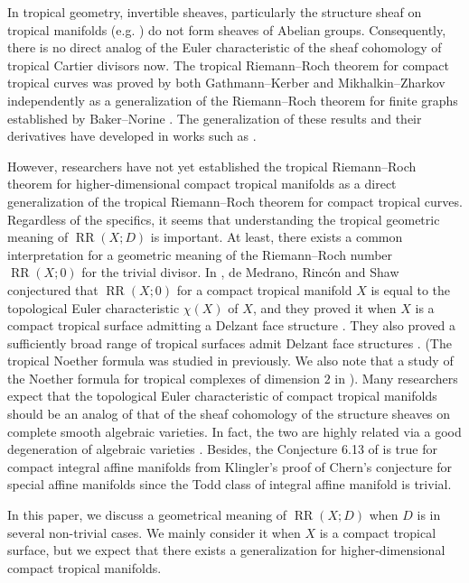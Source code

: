\documentclass[a4paper,dvipdfmx,reqno,12pt]{amsart}
\theoremstyle{definition}
\newcommand{\opn}[1]{\operatorname{#1}}
\numberwithin{equation}{section}
\begin{document}
In tropical geometry, invertible sheaves,
particularly the structure sheaf
on tropical manifolds
(e.g. \cite[]{MR3330789}) 
do not form sheaves of Abelian groups.
Consequently, there is no direct
analog of the Euler characteristic of 
the sheaf cohomology of 
tropical Cartier divisors now.
The tropical Riemann--Roch theorem for 
compact tropical curves was proved by 
both Gathmann--Kerber \cite{MR2377750}
and Mikhalkin--Zharkov \cite{MR2457739}
independently
as a generalization of the 
Riemann--Roch theorem for finite graphs
established by Baker--Norine \cite{MR2355607}. 
The generalization of these results and
their derivatives have developed in works such as 
\cite{MR3046301,MR4251610,MR4229604,MR4444458,MR4512397}.

However, researchers have not yet established
the tropical Riemann--Roch
theorem for higher-dimensional
compact tropical manifolds
as a direct generalization of the tropical
Riemann--Roch theorem for compact tropical curves.
Regardless of the specifics, it seems that understanding
the tropical geometric meaning of $\opn{RR}(X;D)$ is 
important.
At least, there exists a common interpretation
for a geometric meaning of the Riemann--Roch number
$\opn{RR}(X;0)$ for the trivial divisor.
In \cite[Conjecture 6.13]{demedrano2023chern},
de Medrano, Rinc\'on and Shaw conjectured
that $\opn{RR}(X;0)$ for a compact 
tropical manifold $X$ is equal to the 
topological Euler characteristic 
$\chi(X)$ of $X$, 
and they proved it when 
$X$ is a compact tropical surface admitting
a Delzant face structure \cite[Theorem 6.3]{demedrano2023chern}.
They also proved a sufficiently broad range of 
tropical surfaces admit Delzant face structures
\cite[Corollary 6.11]{demedrano2023chern}.
(The tropical Noether formula
was studied in \cite{shaw2015tropical} previously.
We also note that a study of the Noether
formula for tropical complexes of dimension $2$
in \cite{cartwright2015combinatorial}).
Many researchers expect that the topological Euler 
characteristic of compact tropical manifolds
should be an analog of that of the sheaf cohomology
of the structure sheaves on complete
smooth algebraic varieties.
In fact, the two are highly related 
via a good degeneration of algebraic varieties
\cite[Corollary 2]{MR3961331}.
Besides, the Conjecture 6.13 of 
\cite{demedrano2023chern} is true for 
compact integral affine manifolds
from Klingler's proof of Chern's conjecture for
special affine manifolds \cite{MR3665000}
since the Todd class of integral affine manifold
is trivial.

In this paper, we discuss
a geometrical meaning of $\opn{RR}(X;D)$
when $D$ is in several non-trivial cases.
We mainly consider it when $X$ is
a compact tropical surface, but we expect 
that there exists a generalization for
higher-dimensional compact tropical manifolds.
\end{document}
